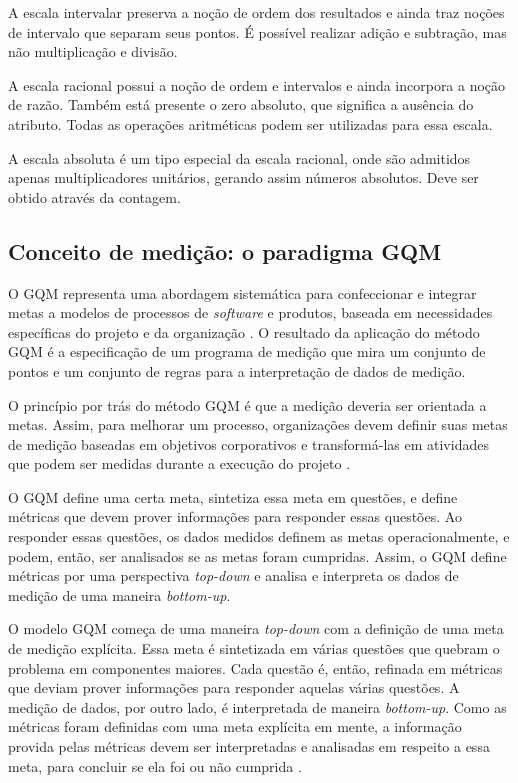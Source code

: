 A escala intervalar preserva a noção de ordem dos resultados e ainda traz noções
de intervalo que separam seus pontos. É possível realizar adição e subtração, mas
não multiplicação e divisão.

A escala racional possui a noção de ordem e intervalos e ainda incorpora a noção
de razão. Também está presente o zero absoluto, que significa a ausência do atributo.
Todas as operações aritméticas podem ser utilizadas para essa escala.

A escala absoluta é um tipo especial da escala racional, onde são admitidos apenas
multiplicadores unitários, gerando assim números absolutos. Deve ser obtido
através da contagem.


\subsection{Conceito de medição: o paradigma GQM}
O GQM representa uma abordagem sistemática para confeccionar e integrar metas a
modelos de processos de \textit{software} e produtos, baseada em necessidades específicas
do projeto e da organização \cite{basiliRombach}. O resultado da aplicação do
método GQM é a especificação de um programa de medição que mira um conjunto de
pontos e um conjunto de regras para a interpretação de dados de medição.

O princípio por trás do método GQM é que a medição deveria ser orientada a metas.
Assim, para melhorar um processo, organizações devem definir suas metas de medição
baseadas em objetivos corporativos e transformá-las em atividades que podem ser
 medidas durante a execução do projeto \cite{egon}.

O GQM define uma certa meta, sintetiza essa meta em questões, e define métricas
que devem prover informações para responder essas questões. Ao responder essas
questões, os dados medidos definem as metas operacionalmente, e podem, então,
ser analisados se as metas foram cumpridas. Assim, o GQM define métricas por uma
perspectiva \textit{top-down} e analisa e interpreta os dados de medição de uma maneira
\textit{bottom-up}.

O modelo GQM começa de uma maneira \textit{top-down} com a definição de uma meta de medição
explícita. Essa meta é sintetizada em várias questões que quebram o problema em
componentes maiores. Cada questão é, então, refinada em métricas que deviam prover
informações para responder aquelas várias questões. A medição de dados, por outro
lado, é interpretada de maneira \textit{bottom-up}. Como as métricas foram definidas com
uma meta explícita em mente, a informação provida pelas métricas devem ser
interpretadas e analisadas em respeito a essa meta, para concluir se ela foi
ou não cumprida \cite{egon}.
